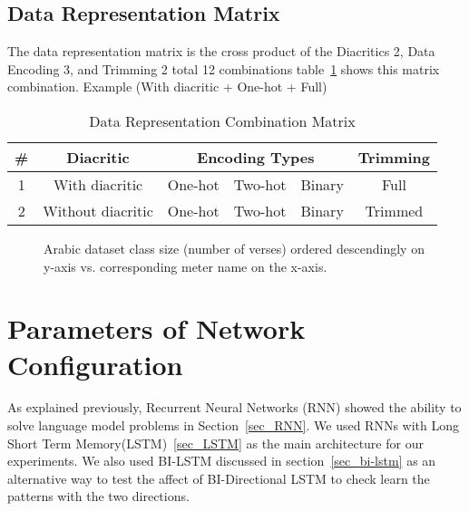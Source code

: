  \subsection{Data Representation Matrix}

  The data representation matrix is the cross product of the Diacritics 2, Data Encoding 3, and Trimming 2 total 12 combinations table~\ref{table:data_representation_matrix} shows this matrix combination. Example (With diacritic + One-hot + Full)

  
\begin{table}[H]
  \centering
  \begin{tabular}{|c|c|c|c|c|c|}
    \hline
    \textbf{\#} & \textbf{Diacritic} & \multicolumn{3}{c|}{\textbf{Encoding Types}}  & \textbf{Trimming} \\
    
    \hline
    1 & With diacritic & One-hot & Two-hot & Binary & Full    \\
        \hline
    2 & Without diacritic & One-hot & Two-hot & Binary & Trimmed \\
\hline
 \end{tabular}
  \caption{Data Representation Combination Matrix}\label{table:data_representation_matrix}
\end{table}


\begin{figure}[H]
	\centering
	\begin{tikzpicture}
	
	\end{tikzpicture}%
	\caption{Arabic dataset class size (number of verses) ordered descendingly on y-axis vs. corresponding meter name on the x-axis.}\label{fig:data_percentage_distribution}
\end{figure}

\newpage

\section{Parameters of Network Configuration}\label{sec_rnn_param}

As explained previously, Recurrent Neural Networks (RNN) showed the ability to solve language model problems in Section~\ref{sec_RNN}. We used RNNs with Long Short Term Memory(LSTM)~\ref{sec_LSTM} as the main architecture for our experiments. We also used BI-LSTM discussed in section~\ref{sec_bi-lstm} as an alternative way to test the affect of BI-Directional LSTM to check learn the patterns with the two directions.

